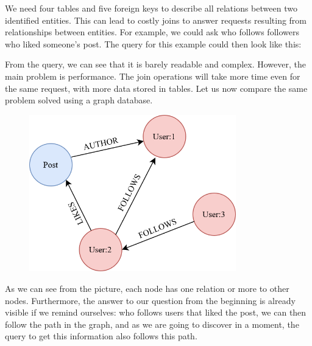 We need four tables and five foreign keys to describe all relations between two identified entities. This can lead to costly joins to answer requests resulting from relationships between entities. For example, we could ask who follows followers who liked someone's post. The query for this example could then look like this:


From the query, we can see that it is barely readable and complex. However, the main problem is performance. The join operations will take more time even for the same request, with more data stored in tables. Let us now compare the same problem solved using a graph database.

\begin{figure}[H]
    \centering
    \includegraphics[width=0.8\textwidth]{content/graph_example.png}
\end{figure}

As we can see from the picture, each node has one relation or more to other nodes. Furthermore, the answer to our question from the beginning is already visible if we remind ourselves: who follows users that liked the post, we can then follow the path in the graph, and as we are going to discover in a moment, the query to get this information also follows this path.

